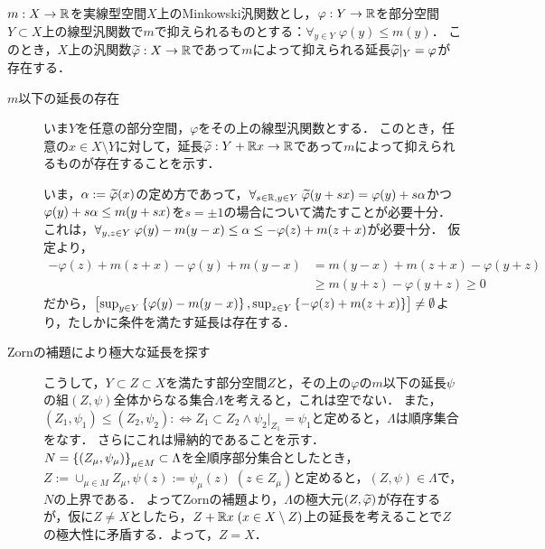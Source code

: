 \documentclass[uplatex,dvipdfmx]{jsreport}
\begin{document}
\begin{lemma}
    $m:X\to\mathbb{R}$を実線型空間$X$上のMinkowski汎関数とし，$\varphi:Y\to\mathbb{R}$を部分空間$Y\subset X$上の線型汎関数で$m$で抑えられるものとする：$\forall_{y\in Y}\;\varphi(y)\le m(y)$．
    このとき，$X$上の汎関数$\widetilde{\varphi}:X\to\mathbb{R}$であって$m$によって抑えられる延長$\widetilde{\varphi}|_Y=\varphi$が存在する．
\end{lemma}
\begin{Proof}\mbox{}
    \begin{description}
        \item[$m$以下の延長の存在] いま$Y$を任意の部分空間，$\varphi$をその上の線型汎関数とする．
        このとき，任意の$x\in X\setminus Y$に対して，延長$\widetilde{\varphi}:Y+\mathbb{R} x\to\mathbb{R}$であって$m$によって抑えられるものが存在することを示す．

        いま，$\alpha:=\widetilde{\varphi}(x)$の定め方であって，$\forall_{s\in\mathbb{R},y\in Y}\;\widetilde{\varphi}(y+sx)=\varphi(y)+s\alpha$かつ$\varphi(y)+s\alpha\le m(y+sx)$を$s=\pm 1$の場合について満たすことが必要十分．
        これは，$\forall_{y,z\in Y}\;\varphi(y)-m(y-x)\le\alpha\le-\varphi(z)+m(z+x)$が必要十分．
        仮定より，
        \begin{align*}
            -\varphi(z)+m(z+x)-\varphi(y)+m(y-x)&=m(y-x)+m(z+x)-\varphi(y+z)\\
            &\ge m(y+z)-\varphi(y+z)\ge 0
        \end{align*}
        だから，$\left[\sup_{y\in Y}\left\{\varphi(y)-m(y-x)\right\},\sup_{z\in Y}\left\{-\varphi(z)+m(z+x)\right\}\right]\ne\emptyset$より，たしかに条件を満たす延長は存在する．
        \item[Zornの補題により極大な延長を探す]
        こうして，$Y\subset Z\subset X$を満たす部分空間$Z$と，その上の$\varphi$の$m$以下の延長$\psi$の組$(Z,\psi)$全体からなる集合$\Lambda$を考えると，これは空でない．
        また，$(Z_1,\psi_1)\le(Z_2,\psi_2):\Leftrightarrow Z_1\subset Z_2\land\psi_2|_{Z_1}=\psi_1$と定めると，$\Lambda$は順序集合をなす．
        さらにこれは帰納的であることを示す．
        $N=\left\{(Z_\mu,\psi_\mu)\right\}_{\mu\in M}\subset\Lambda$を全順序部分集合としたとき，$Z:=\cup_{\mu\in M}Z_\mu,\psi(z):=\psi_\mu(z)\;(z\in Z_\mu)$と定めると，$(Z,\psi)\in\Lambda$で，$N$の上界である．
        よってZornの補題より，$\Lambda$の極大元$(Z,\widetilde{\varphi})$が存在するが，仮に$Z\ne X$としたら，$Z+\mathbb{R} x\;(x\in X\setminus Z)$上の延長を考えることで$Z$の極大性に矛盾する．よって，$Z=X$．
    \end{description}
\end{Proof}
\end{document}
